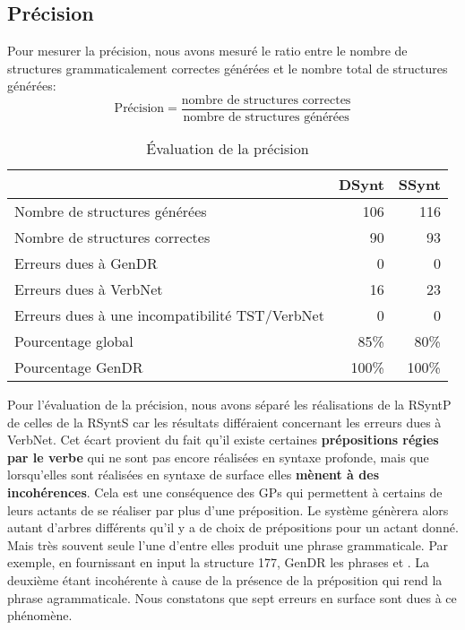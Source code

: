 \subsection{Précision}
Pour mesurer la précision, nous avons mesuré le ratio entre le nombre de structures grammaticalement correctes générées et le nombre total de structures générées:
\[\text{Précision} = \frac{\text{nombre de structures correctes}}{\text{nombre de structures générées}}\]

\begin{table}
\caption{Évaluation de la précision}
\begin{tabular}{lrr}
 \toprule
  & DSynt & SSynt\\
 \midrule
 Nombre de structures générées   & 106  & 116 \\
 Nombre de structures correctes  &  90  & 93   \\
 Erreurs dues à GenDR & 0 & 0\\
 Erreurs dues à VerbNet    & 16 & 23\\
 Erreurs dues à une incompatibilité TST/VerbNet & 0 & 0\\
 \midrule
 Pourcentage global & 85\%  & 80\% \\
 Pourcentage GenDR & 100\%  & 100\% \\
 \bottomrule
\end{tabular}
\end{table}

Pour l'évaluation de la précision, nous avons séparé les réalisations de la \ac{RSyntP} de celles de la \ac{RSyntS} car les résultats différaient concernant les erreurs dues à VerbNet. Cet écart provient du fait qu'il existe certaines \textbf{prépositions régies par le verbe} qui ne sont pas encore réalisées en syntaxe profonde, mais que lorsqu'elles sont réalisées en syntaxe de surface elles \textbf{mènent à des incohérences}. Cela est une conséquence des \acp{GP} qui permettent à certains de leurs actants de se réaliser par plus d'une préposition. Le système génèrera alors autant d'arbres différents qu'il y a de choix de prépositions pour un actant donné. Mais très souvent seule l'une d'entre elles produit une phrase grammaticale. Par exemple, en fournissant en input la structure 177, GenDR les phrases  et \ungr{}. La deuxième étant incohérente à cause de la présence de la préposition  qui rend la phrase agrammaticale. Nous constatons que sept erreurs en surface sont dues à ce phénomène.

